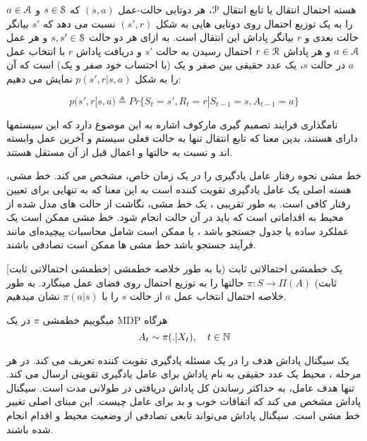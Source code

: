 هسته احتمال انتقال یا تابع انتقال $\EuScript{P}$، هر دوتایی حالت-عمل
$(s,a)$
که 
$s \in \EuScript{S}$
و
$a \in \EuScript{A}$
را به یک توزیع احتمال روی دوتایی هایی به شکل 
$(s',r)$
نسبت می دهد که $s'$ بیانگر حالت بعدی و $r$ بیانگر پاداش این انتقال است. به ازای هر دو حالت 
$s,s' \in \EuScript{S}$
 و هر عمل 
 $a \in \EuScript{A}$
  و هر پاداش 
  $r \in \EuScript{R}$
  احتمال رسیدن به حالت $s'$ و دریافت پاداش $r$ با انتخاب عمل $a$ در حالت $s$، یک عدد حقیقی بین صفر و یک (با احتساب خود صفر و یک) است که آن را به شکل
$p(s',r|s,a)$
نمایش می دهیم:

$$p(s',r|s,a) \triangleq Pr\{S_t=s',R_t=r|S_{t-1}=s,A_{t-1}=a\}$$

نامگذاری فرایند تصمیم گیری مارکوف اشاره به این موضوع دارد که این سیستم\nf ها دارای  هستند، بدین معنا که تابع انتقال تنها به حالت فعلی سیستم و آخرین عمل وابسته اند و نسبت به حالت\nf ها و اعمال قبل از آن مستقل هستند.



خط مشی نحوه رفتار عامل یادگیری را در یک زمان خاص، مشخص می کند. خط مشی، هسته اصلی یک عامل یادگیری تقویت کننده است به این معنا که به تنهایی برای تعیین رفتار کافی است. به طور تقریبی ، یک خط مشی، نگاشت از حالت های مدل شده از محیط به اقداماتی است که باید در آن حالت انجام شود.
خط مشی ممکن است یک عملکرد ساده یا جدول جستجو باشد ، یا ممکن است شامل محاسبات پیچیده‌ای مانند فرآیند جستجو باشد
خط مشی ها ممکن است تصادفی باشند.

[خط\nf مشی احتمالاتی ثابت]
یک خط\nf مشی احتمالاتی ثابت (یا به طور خلاصه خط\nf مشی ثابت) 
$\pi: S \to \Pi(A)$
حالت\nf ها را به توزیع احتمال روی فضای عمل می\nf نگارد.
به طور خلاصه احتمال انتخاب عمل $a$ از حالت $s$ را با
$\pi(a|s)$
نشان می\nf دهیم.


می\nf گوییم خط\nf مشی $\pi$ در یک MDP  هرگاه
$$A_t \sim \pi(. |X_t),	 \quad t \in \mathbb{N}$$


یک سیگنال پاداش هدف را در یک مسئله یادگیری تقویت کننده تعریف می کند. در هر مرحله ، محیط یک عدد حقیقی به نام پاداش برای عامل یادگیری تقویتی ارسال می کند. تنها هدف عامل، به حداکثر رساندن کل پاداش دریافتی در طولانی مدت است. سیگنال پاداش مشخص می کند که اتفاقات خوب و بد برای عامل چیست. این مبنای اصلی تغییر خط مشی است.
سیگنال پاداش می‌تواند تابعی تصادفی از وضعیت محیط و اقدام انجام شده باشند.


